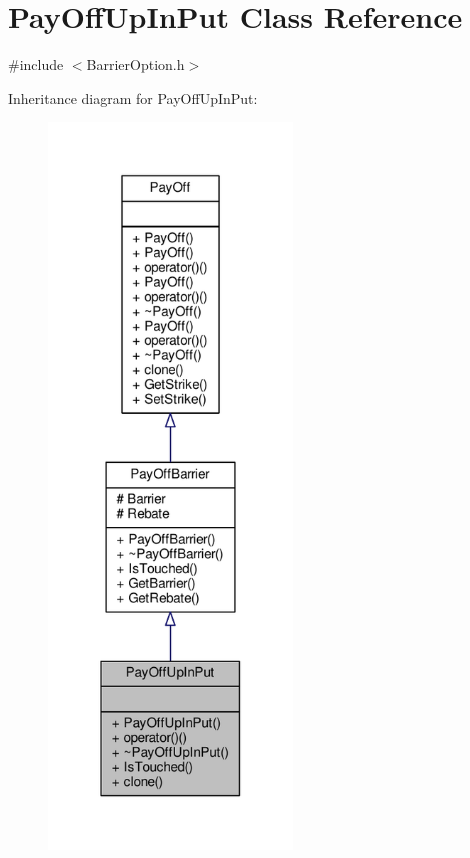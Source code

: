 \hypertarget{classPayOffUpInPut}{}\section{Pay\+Off\+Up\+In\+Put Class Reference}
\label{classPayOffUpInPut}


{\ttfamily \#include $<$Barrier\+Option.\+h$>$}



Inheritance diagram for Pay\+Off\+Up\+In\+Put\+:
\nopagebreak
\begin{figure}[H]
\begin{center}
\leavevmode
\includegraphics[width=184pt]{classPayOffUpInPut__inherit__graph}
\end{center}
\end{figure}


